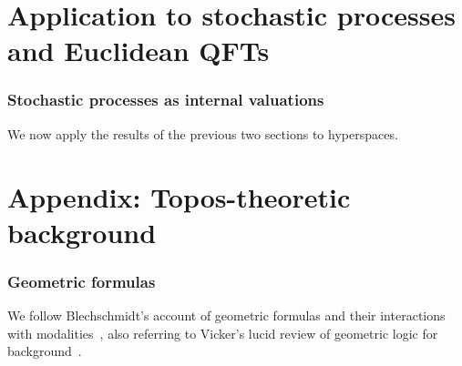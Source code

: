 \documentclass[reqno,11pt]{amsproc}
\theoremstyle{plain}
\theoremstyle{definition}
\numberwithin{equation}{section}
\begin{document}
\newpage
\part{Application to stochastic processes and Euclidean QFTs}

\section{Stochastic processes as internal valuations}

We now apply the results of the previous two sections to hyperspaces.



\appendix
\part{Appendix: Topos-theoretic background}\label{sec.topos_background}

\section{Geometric formulas}

We follow Blechschmidt's account of geometric formulas and their interactions with modalities~\cite[Chapter~2~and~6]{blechschmidt2017internal}, also referring to Vicker's lucid review of geometric logic for background~\cite{vickers_geometric_logic}.

\clearpage



\end{document}
